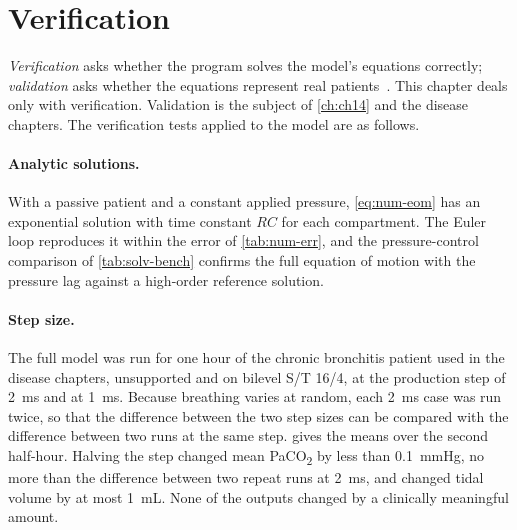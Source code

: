 \section{Verification}
\label{sec:impl-verification}
\emph{Verification} asks whether the program solves the model's equations correctly; \emph{validation} asks whether the equations represent real patients~\citep{oberkampf2010,asme_vv40}. This chapter deals only with verification. Validation is the subject of \cref{ch:ch14} and the disease chapters. The verification tests applied to the model are as follows.

\paragraph{Analytic solutions.} With a passive patient and a constant applied pressure, \cref{eq:num-eom} has an exponential solution with time constant $RC$ for each compartment. The Euler loop reproduces it within the error of \cref{tab:num-err}, and the pressure-control comparison of \cref{tab:solv-bench} confirms the full equation of motion with the pressure lag against a high-order reference solution.

\paragraph{Step size.} The full model was run for one hour of the chronic bronchitis patient used in the disease chapters, unsupported and on bilevel S/T 16/4, at the production step of \SI{2}{\milli\second} and at \SI{1}{\milli\second}. Because breathing varies at random, each \SI{2}{\milli\second} case was run twice, so that the difference between the two step sizes can be compared with the difference between two runs at the same step.  gives the means over the second half-hour. Halving the step changed mean PaCO\textsubscript{2} by less than \SI{0.1}{\mmHg}, no more than the difference between two repeat runs at \SI{2}{\milli\second}, and changed tidal volume by at most \SI{1}{\milli\liter}. None of the outputs changed by a clinically meaningful amount.

